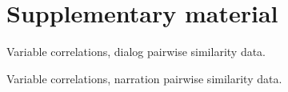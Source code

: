 \appendix

\section{Supplementary material}

\begin{table}
  \centering
  \begin{adjustbox}{angle=90}
    
  \end{adjustbox}
  \caption{Variable correlations, dialog pairwise similarity data.}
  \label{tab:dialogvarcor}
\end{table}
\begin{table}
  \centering
  \begin{adjustbox}{angle=90}
    
  \end{adjustbox}
  \caption{Variable correlations, narration pairwise similarity data.}
  \label{tab:narrationvarcor}
\end{table}
